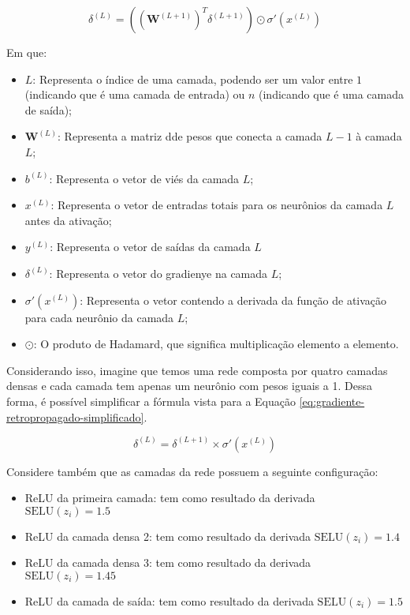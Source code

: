 \[
    \delta^{(L)} = \left( \left( \textbf{W}^{(L+1)} \right)^T \delta^{(L+1)} \right)  \odot \sigma'(x^{(L)})
\]

Em que: 

\begin{itemize}
    \item $L$: Representa o índice de uma camada, podendo ser um valor entre $1$ (indicando que é uma camada de entrada) ou $n$ (indicando que é uma camada de saída);
    \item $\textbf{W}^{(L)}$: Representa a matriz dde pesos que conecta a camada $L - 1$ à camada $L$;
    \item $b^{(L)}$: Representa o vetor de viés da camada $L$;
    \item $x^{(L)}$: Representa o vetor de entradas totais para os neurônios da camada $L$ antes da ativação;
    \item $y^{(L)}$: Representa o vetor de saídas da camada $L$
    \item $\delta^{(L)}$: Representa o vetor do gradienye na camada $L$;
    \item $\sigma'(x^{(L)})$: Representa o vetor contendo a derivada da função de ativação para cada neurônio da camada $L$;
    \item $\odot$: O produto de Hadamard, que significa multiplicação elemento a elemento.
\end{itemize}

Considerando isso, imagine que temos uma rede composta por quatro camadas densas e cada camada tem apenas um neurônio com pesos iguais a 1. Dessa forma, é possível simplificar a fórmula vista para a Equação \ref{eq:gradiente-retropropagado-simplificado}.

\begin{equation}
        \delta^{(L)} =  \delta^{(L+1)} \times \sigma'(x^{(L)})
        \label{eq:gradiente-retropropagado-simplificado}
\end{equation}

Considere também que as camadas da rede possuem a seguinte configuração:

\begin{itemize}
    \item ReLU da primeira camada: tem como resultado da derivada $\text{SELU}(z_i) = 1.5$
    \item ReLU da camada densa 2: tem como resultado da derivada $\text{SELU}(z_i) = 1.4$
    \item ReLU da camada densa 3: tem como resultado da derivada $\text{SELU}(z_i) = 1.45$
    \item ReLU da camada de saída: tem como resultado da derivada $\text{SELU}(z_i) = 1.5$
\end{itemize}


